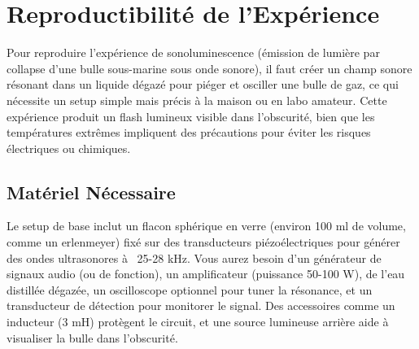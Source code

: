 \documentclass[a4paper,12pt]{article}
\begin{document}
\section{Reproductibilité de l’Expérience}
Pour reproduire l'expérience de sonoluminescence (émission de lumière par collapse d'une bulle sous-marine sous onde sonore), il faut créer un champ sonore résonant dans un liquide dégazé pour piéger et osciller une bulle de gaz, ce qui nécessite un setup simple mais précis à la maison ou en labo amateur. Cette expérience produit un flash lumineux visible dans l'obscurité, bien que les températures extrêmes impliquent des précautions pour éviter les risques électriques ou chimiques.
\subsection{Matériel Nécessaire}
Le setup de base inclut un flacon sphérique en verre (environ 100 ml de volume, comme un erlenmeyer) fixé sur des transducteurs piézoélectriques pour générer des ondes ultrasonores à ~25-28 kHz. Vous aurez besoin d'un générateur de signaux audio (ou de fonction), un amplificateur (puissance 50-100 W), de l'eau distillée dégazée, un oscilloscope optionnel pour tuner la résonance, et un transducteur de détection pour monitorer le signal. Des accessoires comme un inducteur (3 mH) protègent le circuit, et une source lumineuse arrière aide à visualiser la bulle dans l'obscurité.
\end{document}

